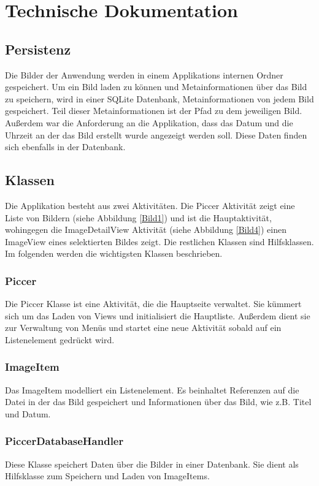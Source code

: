 \chapter{Technische Dokumentation}

\section{Persistenz}
Die Bilder der Anwendung werden in einem Applikations internen Ordner gespeichert.
Um ein Bild laden zu können und Metainformationen über das Bild zu speichern,
wird in einer SQLite Datenbank, Metainformationen von jedem Bild gespeichert.
Teil dieser Metainformationen ist der Pfad zu dem jeweiligen Bild.
Außerdem war die Anforderung an die Applikation, dass das Datum und die Uhrzeit an der das
Bild erstellt wurde angezeigt werden soll.
Diese Daten finden sich ebenfalls in der Datenbank.

\section{Klassen}
Die Applikation besteht aus zwei Aktivitäten. 
Die Piccer Aktivität zeigt eine Liste von Bildern (siehe Abbildung \ref{Bild1}) und ist die Hauptaktivität,
wohingegen die ImageDetailView Aktivität (siehe Abbildung \ref{Bild4}) einen ImageView eines selektierten Bildes zeigt.
Die restlichen Klassen sind Hilfsklassen.
Im folgenden werden die wichtigsten Klassen beschrieben.

\subsection{Piccer}
Die Piccer Klasse ist eine Aktivität, die die Hauptseite verwaltet.
Sie kümmert sich um das Laden von Views und initialisiert die Hauptliste.
Außerdem dient sie zur Verwaltung von Menüs und startet eine neue Aktivität sobald auf ein 
Listenelement gedrückt wird.

\subsection{ImageItem}
Das ImageItem modelliert ein Listenelement.
Es beinhaltet Referenzen auf die Datei in der das Bild gespeichert
und Informationen über das Bild, wie z.B. Titel und Datum.

\subsection{PiccerDatabaseHandler}
Diese Klasse speichert Daten über die Bilder in einer Datenbank.
Sie dient als Hilfsklasse zum Speichern und Laden von ImageItems.

